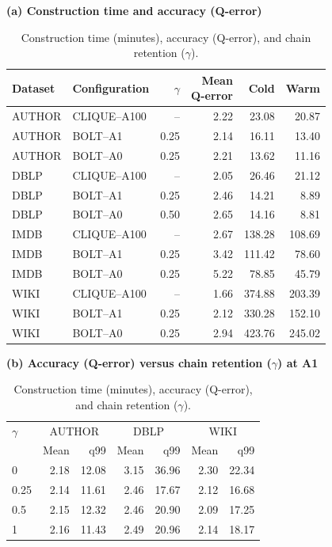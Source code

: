 \begin{table}[!t]
\centering
\small
\setlength{\tabcolsep}{1.5pt}
\caption{Construction time (minutes), accuracy (Q-error), and chain retention ($\gamma$).}
\label{tab:construction}
\textbf{(a) Construction time and accuracy (Q-error)}\par\smallskip
\begin{tabular*}{\columnwidth}{@{\extracolsep{\fill}}llrrrr@{}}
\toprule
Dataset & Configuration & $\gamma$ & \shortstack{Mean\\Q-error} & Cold & Warm \\
\midrule
AUTHOR & CLIQUE--A100 & -- & 2.22 & 23.08 & 20.87 \\
AUTHOR & BOLT--A1 & 0.25 & 2.14 & 16.11 & 13.40 \\
AUTHOR & BOLT--A0 & 0.25 & 2.21 & 13.62 & 11.16 \\
DBLP & CLIQUE--A100 & -- & 2.05 & 26.46 & 21.12 \\
DBLP & BOLT--A1 & 0.25 & 2.46 & 14.21 & 8.89 \\
DBLP & BOLT--A0 & 0.50 & 2.65 & 14.16 & 8.81 \\
IMDB & CLIQUE--A100 & -- & 2.67 & 138.28 & 108.69 \\
IMDB & BOLT--A1 & 0.25 & 3.42 & 111.42 & 78.60 \\
IMDB & BOLT--A0 & 0.25 & 5.22 & 78.85 & 45.79 \\
WIKI & CLIQUE--A100 & -- & 1.66 & 374.88 & 203.39 \\
WIKI & BOLT--A1 & 0.25 & 2.12 & 330.28 & 152.10 \\
WIKI & BOLT--A0 & 0.25 & 2.94 & 423.76 & 245.02 \\
\bottomrule
\end{tabular*}
\par\medskip
\textbf{(b) Accuracy (Q-error) versus chain retention ($\gamma$) at A1}\par\smallskip
\begin{tabular*}{\columnwidth}{@{\extracolsep{\fill}}lrrrrrr@{}}
\toprule
$\gamma$ & \multicolumn{2}{c}{AUTHOR} & \multicolumn{2}{c}{DBLP} & \multicolumn{2}{c}{WIKI} \\
\cmidrule(lr){2-3}\cmidrule(lr){4-5}\cmidrule(lr){6-7}
 & Mean & q99 & Mean & q99 & Mean & q99 \\
\midrule
0 & 2.18 & 12.08 & 3.15 & 36.96 & 2.30 & 22.34 \\
0.25 & 2.14 & 11.61 & 2.46 & 17.67 & 2.12 & 16.68 \\
0.5 & 2.15 & 12.32 & 2.46 & 20.90 & 2.09 & 17.25 \\
1 & 2.16 & 11.43 & 2.49 & 20.96 & 2.14 & 18.17 \\
\bottomrule
\end{tabular*}
\end{table}
